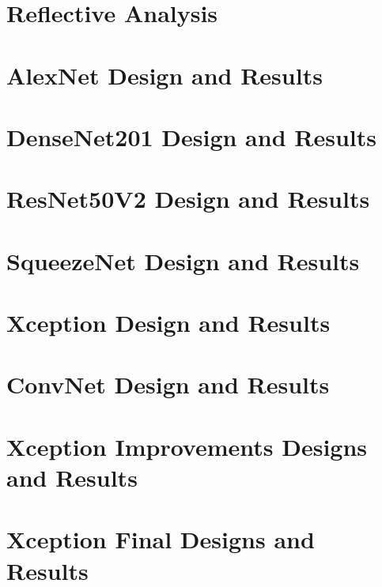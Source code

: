 \documentclass[harvard]{lincolncsthesis}
\begin{document}
\chapter{Reflective Analysis}




\printReferences


\appendix
\chapter{AlexNet Design and Results}

\chapter{DenseNet201 Design and Results}

\chapter{ResNet50V2 Design and Results}

\chapter{SqueezeNet Design and Results}

\chapter{Xception Design and Results}

\chapter{ConvNet Design and Results}

\chapter{Xception Improvements Designs and Results}

\chapter{Xception Final Designs and Results}

\end{document}
